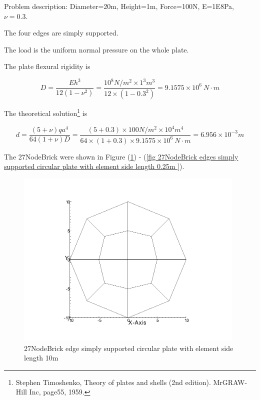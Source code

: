 \documentclass[fleqn,11pt,letter]{article}
\begin{document}
Problem description: Diameter=20m, Height=1m, Force=100N, E=1E8Pa, $\nu=0.3$. 

The four edges are simply supported. 

The load is the uniform normal pressure on the whole plate. 


The plate flexural rigidity is 

\begin{equation}
  D=\frac{Eh^3}{12(1-\nu^2)}=\frac{10^8 N/m^2 \times 1^3 m^3 }{12 \times (1-0.3^2) }= 9.1575 \times 10^6 \ N\cdot m
\end{equation}

The theoretical solution\footnote{Stephen Timoshenko, Theory of plates and shells (2nd edition). MrGRAW-Hill Inc, page55, 1959.} is 

\begin{equation}
  d= \frac{(5+\nu)  q a^4}{64(1+\nu) D}=\frac{(5+0.3)\times 100 N/m^2 \times 10^4 m^4}{64\times(1+0.3) \times 9.1575 \times 10^6 \ N\cdot m}=6.956\times 10^{-3} m
\end{equation}



The 27NodeBrick were shown in Figure (\ref{fig 27NodeBrick edges simply supported circular plate with element side length 10m }) - (\ref{fig 27NodeBrick edges simply supported circular plate with element side length 0.25m }). 



\begin{figure}[H]
  \centering
  \includegraphics[width=11cm]{../Figure_files/27NodeBrick/circular_plate1.png}
  \caption{27NodeBrick edge simply supported circular plate with element side length 10m }
  \label{fig 27NodeBrick edges simply supported circular plate with element side length 10m }
\end{figure}
\end{document}
